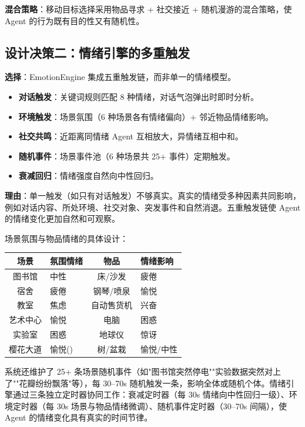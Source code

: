 \documentclass[12pt,a4paper]{article}%
\begin{document}
\textbf{混合策略}：移动目标选择采用物品寻求 + 社交接近 + 随机漫游的混合策略，使 Agent 的行为既有目的性又有随机性。

\subsection{设计决策二：情绪引擎的多重触发}

\textbf{选择}：EmotionEngine 集成五重触发链，而非单一的情绪模型。

\begin{itemize}
	\item \textbf{对话触发}：关键词规则匹配 8 种情绪，对话气泡弹出时即时分析。
	\item \textbf{环境触发}：场景氛围（6 种场景各有情绪偏向）+ 邻近物品情绪影响。
	\item \textbf{社交共鸣}：近距离同情绪 Agent 互相放大，异情绪互相中和。
	\item \textbf{随机事件}：场景事件池（6 种场景共 25+ 事件）定期触发。
	\item \textbf{衰减回归}：情绪强度自然向中性回归。
\end{itemize}

\textbf{理由}：单一触发（如只有对话触发）不够真实。真实的情绪受多种因素共同影响，例如对话内容、所处环境、社交对象、突发事件和自然消退。五重触发链使 Agent 的情绪变化更加自然和可观察。

场景氛围与物品情绪的具体设计：

\begin{table}[H]
	\centering
	\begin{tabular}{clcl}
		\toprule
		\textbf{场景} & \textbf{氛围情绪} & \textbf{物品} & \textbf{情绪影响} \\
		\midrule
		图书馆 & 中性 & 床/沙发 & 疲倦 \\
		宿舍 & 疲倦 & 钢琴/喷泉 & 愉悦 \\
		教室 & 焦虑 & 自动售货机 & 兴奋 \\
		艺术中心 & 愉悦 & 电脑 & 困惑 \\
		实验室 & 困惑 & 地球仪 & 惊讶 \\
		樱花大道 & 愉悦(\texttimes 2) & 树/盆栽 & 愉悦/中性 \\
		\bottomrule
	\end{tabular}
\end{table}

系统还维护了 25+ 条场景随机事件（如"图书馆突然停电""实验数据突然对上了""花瓣纷纷飘落"等），每 30--70s 随机触发一条，影响全体或随机个体。情绪引擎通过三条独立定时器协同工作：衰减定时器（每 30s 情绪向中性回归一级）、环境定时器（每 30s 场景与物品情绪微调）、随机事件定时器（30--70s 间隔），使 Agent 的情绪变化具有真实的时间节律。
\end{document}
